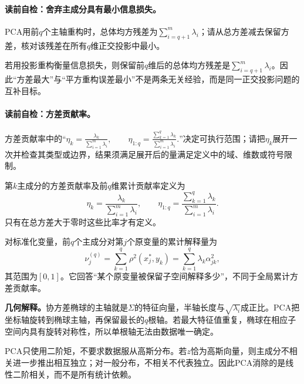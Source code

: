 \paragraph{读前自检：舍弃主成分具有最小信息损失。}PCA用前$q$个主轴重构时，总体均方残差为$\sum_{i=q+1}^m\lambda_i$；请从总方差减去保留方差，核对该残差在所有$q$维正交投影中最小。\par

若用投影重构衡量信息损失，则保留前$q$维后的总体均方残差是$\sum_{i=q+1}^m\lambda_i$。因此“方差最大”与“平方重构误差最小”不是两条无关经验，而是同一正交投影问题的互补目标。

\paragraph{读前自检：方差贡献率。}方差贡献率中的“$\eta_k=\frac{\lambda_k}{\sum_{i=1}^m\lambda_i}, \qquad \eta_{1:q}=\frac{\sum_{k=1}^q\lambda_k}{\sum_{i=1}^m\lambda_i}.$”决定可执行范围；请把$\eta_k$展开一次并检查其类型或边界，结果须满足展开后的量满足定义中的域、维数或符号限制。\par

第$k$主成分的方差贡献率及前$q$维累计贡献率定义为
\[
\eta_k=\frac{\lambda_k}{\sum_{i=1}^m\lambda_i},
\qquad
\eta_{1:q}=\frac{\sum_{k=1}^q\lambda_k}{\sum_{i=1}^m\lambda_i}.
\]
只有在总方差大于零时这些比率才有定义。

对标准化变量，前$q$个主成分对第$j$个原变量的累计解释量为
\[
\nu_j^{(q)}=\sum_{k=1}^q\rho^2(x_j^*,y_k)
=\sum_{k=1}^q\lambda_k\alpha_{jk}^2,
\]
其范围为$[0,1]$。它回答“某个原变量被保留子空间解释多少”，不同于全局累计方差贡献率。


\label{struct:V4-C04-CH14}
\begin{geometrybox}
\textbf{几何解释。}协方差椭球的主轴就是$\Sigma$的特征向量，半轴长度与$\sqrt{\lambda_i}$成正比。PCA把坐标轴旋转到椭球主轴，再保留最长的$q$根轴。若最大特征值重复，椭球在相应子空间内具有旋转对称性，所以单根轴无法由数据唯一确定。
\end{geometrybox}

\label{struct:V4-C04-CH15}
\begin{probabilitybox}
PCA只使用二阶矩，不要求数据服从高斯分布。若$z$恰为高斯向量，则主成分不相关进一步推出相互独立；对一般分布，不相关不代表独立。因此PCA消除的是线性二阶相关，而不是所有统计依赖。
\end{probabilitybox}

